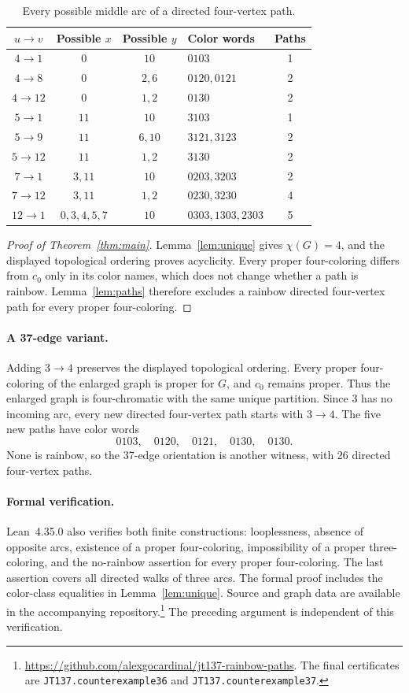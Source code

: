 \documentclass[11pt]{article}
\begin{document}
\begin{table}[t]
\centering
\caption{Every possible middle arc of a directed four-vertex path.}\label{tab:paths}
\small
\begin{tabular}{ccclc}
\toprule
$u\to v$&Possible $x$&Possible $y$&Color words&Paths\\
\midrule
$4\to1$&$0$&$10$&$0103$&1\\
$4\to8$&$0$&$2,6$&$0120,0121$&2\\
$4\to12$&$0$&$1,2$&$0130$&2\\
$5\to1$&$11$&$10$&$3103$&1\\
$5\to9$&$11$&$6,10$&$3121,3123$&2\\
$5\to12$&$11$&$1,2$&$3130$&2\\
$7\to1$&$3,11$&$10$&$0203,3203$&2\\
$7\to12$&$3,11$&$1,2$&$0230,3230$&4\\
$12\to1$&$0,3,4,5,7$&$10$&$0303,1303,2303$&5\\
\bottomrule
\end{tabular}
\end{table}

\begin{proof}[Proof of Theorem~\ref{thm:main}]
Lemma~\ref{lem:unique} gives $\chi(G)=4$, and the displayed topological ordering proves acyclicity. Every proper four-coloring differs from $c_0$ only in its color names, which does not change whether a path is rainbow. Lemma~\ref{lem:paths} therefore excludes a rainbow directed four-vertex path for every proper four-coloring.
\end{proof}


\paragraph{A 37-edge variant.}
Adding $3\to4$ preserves the displayed topological ordering. Every proper four-coloring of the enlarged graph is proper for $G$, and $c_0$ remains proper. Thus the enlarged graph is four-chromatic with the same unique partition. Since $3$ has no incoming arc, every new directed four-vertex path starts with $3\to4$. The five new paths have color words
\[
0103,\quad0120,\quad0121,\quad0130,\quad0130.
\]
None is rainbow, so the 37-edge orientation is another witness, with 26 directed four-vertex paths.

\paragraph{Formal verification.}
Lean~4.35.0 also verifies both finite constructions: looplessness, absence of opposite arcs, existence of a proper four-coloring, impossibility of a proper three-coloring, and the no-rainbow assertion for every proper four-coloring. The last assertion covers all directed walks of three arcs. The formal proof includes the color-class equalities in Lemma~\ref{lem:unique}. Source and graph data are available in the accompanying repository.\footnote{\url{https://github.com/alexgocardinal/jt137-rainbow-paths}. The final certificates are \texttt{JT137.counterexample36} and \texttt{JT137.counterexample37}.} The preceding argument is independent of this verification.
\end{document}
